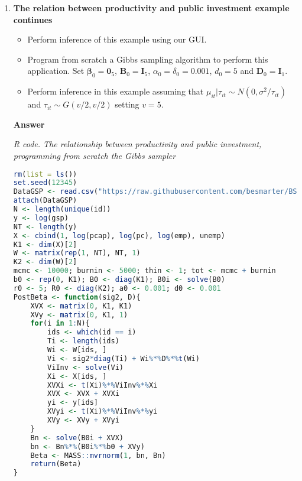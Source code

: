 \begin{enumerate}[leftmargin=*]
	\item \textbf{The relation between productivity and public investment example continues}

\begin{itemize}
	\item Perform inference of this example using our GUI.
	\item Program from scratch a Gibbs sampling algorithm to perform this application. Set $\bm{\beta}_0=\bm{0}_5$, $\bm{B}_0=\bm{I}_5$, $\alpha_0=\delta_0=0.001$, $d_0=5$ and $\bm{D}_0=\bm{I}_1$.
	\item Perform inference in this example assuming that $\mu_{it}|\tau_{it}\sim N(0, \sigma^2/\tau_{it})$ and $\tau_{it}\sim G(v/2,v/2)$ setting $v=5$. 
\end{itemize}

\textbf{Answer}
\begin{tcolorbox}[enhanced,width=4.67in,center upper,
	fontupper=\large\bfseries,drop shadow southwest,sharp corners]
	\textit{R code. The relationship between productivity and public investment, programming from scratch the Gibbs sampler}
	\begin{VF}
		\begin{lstlisting}[language=R]
rm(list = ls())
set.seed(12345)
DataGSP <- read.csv("https://raw.githubusercontent.com/besmarter/BSTApp/refs/heads/master/DataApp/8PublicCap.csv", sep = ",", header = TRUE, quote = "")
attach(DataGSP)
N <- length(unique(id))
y <- log(gsp)
NT <- length(y)
X <- cbind(1, log(pcap), log(pc), log(emp), unemp)
K1 <- dim(X)[2]
W <- matrix(rep(1, NT), NT, 1)
K2 <- dim(W)[2]
mcmc <- 10000; burnin <- 5000; thin <- 1; tot <- mcmc + burnin
b0 <- rep(0, K1); B0 <- diag(K1); B0i <- solve(B0) 
r0 <- 5; R0 <- diag(K2); a0 <- 0.001; d0 <- 0.001
PostBeta <- function(sig2, D){
	XVX <- matrix(0, K1, K1)
	XVy <- matrix(0, K1, 1)
	for(i in 1:N){
		ids <- which(id == i)
		Ti <- length(ids)
		Wi <- W[ids, ]
		Vi <- sig2*diag(Ti) + Wi%*%D%*%t(Wi)
		ViInv <- solve(Vi)
		Xi <- X[ids, ]
		XVXi <- t(Xi)%*%ViInv%*%Xi
		XVX <- XVX + XVXi
		yi <- y[ids]
		XVyi <- t(Xi)%*%ViInv%*%yi
		XVy <- XVy + XVyi
	}
	Bn <- solve(B0i + XVX)
	bn <- Bn%*%(B0i%*%b0 + XVy)
	Beta <- MASS::mvrnorm(1, bn, Bn)
	return(Beta)
}
\end{lstlisting}
	\end{VF}
\end{tcolorbox}



\end{enumerate}
